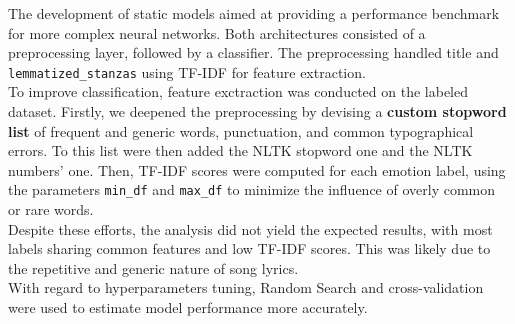 

The development of static models aimed at providing a performance benchmark for
more complex neural networks.
Both architectures consisted of a preprocessing layer, followed by a classifier.
The preprocessing handled title and \texttt{lemmatized\_stanzas} using TF-IDF for feature
extraction.\\

To improve classification, feature exctraction was conducted on the labeled dataset. Firstly, we deepened the preprocessing by devising a \textbf{custom stopword list} of frequent and generic words, punctuation, and common typographical errors. To this list were then added the NLTK stopword one and the NLTK numbers' one.
Then, TF-IDF scores were computed for each emotion label, using the parameters \texttt{min\_df} and \texttt{max\_df} to minimize the influence of overly common or rare words. \\
Despite these efforts, the analysis did not yield the expected results, with most labels sharing common features and low TF-IDF scores.
This was likely due to the repetitive and generic nature of song lyrics.\\
With regard to hyperparameters tuning, Random Search and cross-validation were used to
estimate model performance more accurately.



